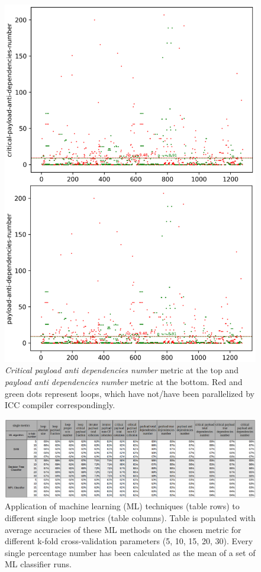 \begin{figure}[h]
	\centering
	\includegraphics[width=\linewidth]{figs/loop-dependencies-number-2.png}
	\caption{\textit{Critical payload anti dependencies number} metric at the top and \textit{payload anti dependencies number} metric at the bottom. Red and green dots represent loops, which have not/have been parallelized by ICC compiler correspondingly.}
	\label{loop-dependencies-number-2}
\end{figure}

\begin{figure}[htb]
	\centering
	\includegraphics[width=\linewidth]{figs/single-metric-ml-table-1.png}
	\caption{Application of machine learning (ML) techniques (table rows) to different single loop metrics (table columns). Table is populated with average accuracies of these ML methods on the chosen metric for different k-fold cross-validation parameters (5, 10, 15, 20, 30). Every single percentage number has been calculated as the mean of a set of ML classifier runs. }
	\label{single-metric-ml-table-1}
\end{figure}

